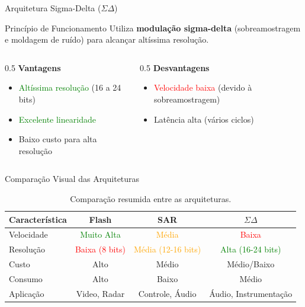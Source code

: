\documentclass{beamer}
\begin{document}
\begin{frame}{Arquitetura Sigma-Delta ($\Sigma\Delta$)}
    \begin{block}{Princípio de Funcionamento}
        Utiliza \textbf{modulação sigma-delta} (sobreamostragem e moldagem de ruído) para alcançar altíssima resolução.
    \end{block}
    \begin{figure}
        \centering
    \end{figure}
    \begin{columns}[t]
        \begin{column}{0.5\textwidth}
            \textbf{Vantagens}
            \begin{itemize}
                \item \textcolor{green}{Altíssima resolução} (16 a 24 bits)
                \item \textcolor{green}{Excelente linearidade}
                \item Baixo custo para alta resolução
            \end{itemize}
        \end{column}
        \begin{column}{0.5\textwidth}
            \textbf{Desvantagens}
            \begin{itemize}
                \item \textcolor{red}{Velocidade baixa} (devido à sobreamostragem)
                \item Latência alta (vários ciclos)
            \end{itemize}
        \end{column}
    \end{columns}
\end{frame}

\begin{frame}{Comparação Visual das Arquiteturas}
    \begin{table}
        \centering
        \begin{tabular}{lccc}
            \toprule
            \textbf{Característica} & \textbf{Flash} & \textbf{SAR} & \textbf{$\Sigma\Delta$} \\
            \midrule
            Velocidade & \textcolor{green}{Muito Alta} & \textcolor{orange}{Média} & \textcolor{red}{Baixa} \\
            Resolução & \textcolor{red}{Baixa (8 bits)} & \textcolor{orange}{Média (12-16 bits)} & \textcolor{green}{Alta (16-24 bits)} \\
            Custo & Alto & Médio & Médio/Baixo \\
            Consumo & Alto & Baixo & Médio \\
            Aplicação & Video, Radar & Controle, Áudio & Áudio, Instrumentação \\
            \bottomrule
        \end{tabular}
        \caption{Comparação resumida entre as arquiteturas.}
    \end{table}
\end{frame}
\end{document}
